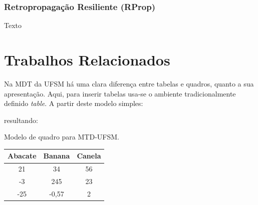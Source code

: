 \documentclass[oneside,openright,12pt]{ufsm_2015} %
\begin{document}
            \subsection{Retropropagação Resiliente (RProp)}
                \par Texto
    \chapter{Trabalhos Relacionados}
             
         \par Na MDT da UFSM há uma clara diferença entre tabelas e quadros, quanto a sua apresentação. Aqui, para inserir tabelas usa-se o ambiente tradicionalmente definido \textit{table}. A partir deste modelo simples:
             
         \noindent resultando:
             
       \begin{quadro}
          \caption{Modelo de quadro para MTD-UFSM.}
          \centering
          \begin{tabular}{| c |c |c |}
          \hline
          Abacate & Banana & Canela \\
          \hline
          21 & 34 & 56 \\
          \hline
          -3 & 245 & 23 \\
          \hline
          -25 & -0,57 & 2 \\
          \hline
          \end{tabular}
          \vspace{\baselineskip} %
      \end{quadro}
          
\end{document}
